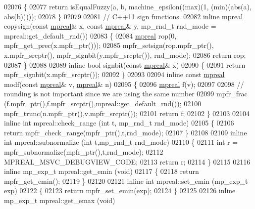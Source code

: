 \begin{DoxyCode}
{{02076 \{
02077     \textcolor{keywordflow}{return} isEqualFuzzy(a, b, machine\_epsilon((max)(1, (min)(abs(a), abs(b)))));
02078 \}
02079 
02081 \textcolor{comment}{// C++11 sign functions.}
02082 \textcolor{keyword}{inline} \hyperlink{classmpfr_1_1mpreal}{mpreal} copysign(\textcolor{keyword}{const} \hyperlink{classmpfr_1_1mpreal}{mpreal}& x, \textcolor{keyword}{const}  \hyperlink{classmpfr_1_1mpreal}{mpreal}& y, mp\_rnd\_t rnd\_mode = 
      mpreal::get\_default\_rnd())
02083 \{
02084     \hyperlink{classmpfr_1_1mpreal}{mpreal} rop(0, mpfr\_get\_prec(x.mpfr\_ptr()));
02085     mpfr\_setsign(rop.mpfr\_ptr(), x.mpfr\_srcptr(), mpfr\_signbit(y.mpfr\_srcptr()), rnd\_mode);
02086     \textcolor{keywordflow}{return} rop;
02087 \}
02088 
02089 \textcolor{keyword}{inline} \textcolor{keywordtype}{bool} signbit(\textcolor{keyword}{const} \hyperlink{classmpfr_1_1mpreal}{mpreal}& x)
02090 \{
02091     \textcolor{keywordflow}{return} mpfr\_signbit(x.mpfr\_srcptr());
02092 \}
02093 
02094 \textcolor{keyword}{inline} \textcolor{keyword}{const} \hyperlink{classmpfr_1_1mpreal}{mpreal} modf(\textcolor{keyword}{const} \hyperlink{classmpfr_1_1mpreal}{mpreal}& v, \hyperlink{classmpfr_1_1mpreal}{mpreal}& n)
02095 \{
02096     \hyperlink{classmpfr_1_1mpreal}{mpreal} f(v);
02097 
02098     \textcolor{comment}{// rounding is not important since we are using the same number}
02099     mpfr\_frac (f.mpfr\_ptr(),f.mpfr\_srcptr(),mpreal::get\_default\_rnd());
02100     mpfr\_trunc(n.mpfr\_ptr(),v.mpfr\_srcptr());
02101     \textcolor{keywordflow}{return} f;
02102 \}
02103 
02104 \textcolor{keyword}{inline} \textcolor{keywordtype}{int} mpreal::check\_range (\textcolor{keywordtype}{int} t, mp\_rnd\_t rnd\_mode)
02105 \{
02106     \textcolor{keywordflow}{return} mpfr\_check\_range(mpfr\_ptr(),t,rnd\_mode);
02107 \}
02108 
02109 \textcolor{keyword}{inline} \textcolor{keywordtype}{int} mpreal::subnormalize (\textcolor{keywordtype}{int} t,mp\_rnd\_t rnd\_mode)
02110 \{
02111     \textcolor{keywordtype}{int} r = mpfr\_subnormalize(mpfr\_ptr(),t,rnd\_mode);
02112     MPREAL\_MSVC\_DEBUGVIEW\_CODE;
02113     \textcolor{keywordflow}{return} r;
02114 \}
02115 
02116 \textcolor{keyword}{inline} mp\_exp\_t mpreal::get\_emin (\textcolor{keywordtype}{void})
02117 \{
02118     \textcolor{keywordflow}{return} mpfr\_get\_emin();
02119 \}
02120 
02121 \textcolor{keyword}{inline} \textcolor{keywordtype}{int} mpreal::set\_emin (mp\_exp\_t exp)
02122 \{
02123     \textcolor{keywordflow}{return} mpfr\_set\_emin(exp);
02124 \}
02125 
02126 \textcolor{keyword}{inline} mp\_exp\_t mpreal::get\_emax (\textcolor{keywordtype}{void})
}}
\end{DoxyCode}
